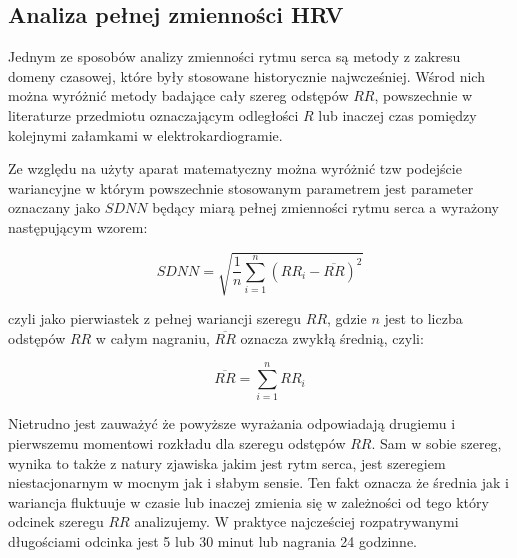 \subsection{Analiza pełnej zmienności HRV}

Jednym ze sposobów analizy zmienności rytmu serca są metody z zakresu domeny czasowej,
które były stosowane historycznie najwcześniej. Wśrod nich można wyróżnić metody
badające cały szereg odstępów $RR$, powszechnie w literaturze przedmiotu oznaczającym
odległości $R$ lub inaczej czas pomiędzy kolejnymi załamkami w elektrokardiogramie.

Ze względu na użyty aparat matematyczny można wyróżnić tzw podejście wariancyjne w którym
powszechnie stosowanym parametrem jest parameter oznaczany jako $SDNN$ będący miarą pełnej
zmienności rytmu serca a wyrażony następującym wzorem:  

\begin{equation}\label{eq6}
SDNN = \sqrt{\frac{1}{n}\sum_{i=1}^{n}(RR_{i} - \overline{RR})^{2}}
\end{equation}

czyli jako pierwiastek z pełnej wariancji szeregu $RR$, gdzie $n$ jest to liczba odstępów $RR$
w całym nagraniu, $\overline{RR}$ oznacza zwykłą średnią, czyli:

\begin{equation}
\overline{RR} = \sum_{i=1}^{n}RR_{i}
\end{equation}

Nietrudno jest zauważyć że powyższe wyrażania odpowiadają drugiemu i pierwszemu momentowi
rozkładu dla szeregu odstępów $RR$. Sam w sobie szereg, wynika to także z natury
zjawiska jakim jest rytm serca, jest szeregiem niestacjonarnym w mocnym jak i słabym
sensie. Ten fakt oznacza że średnia jak i wariancja fluktuuje w czasie lub inaczej zmienia
się w zależności od tego który odcinek szeregu $RR$ analizujemy. W praktyce najcześciej
rozpatrywanymi długościami odcinka jest 5 lub 30 minut lub nagrania 24 godzinne.

